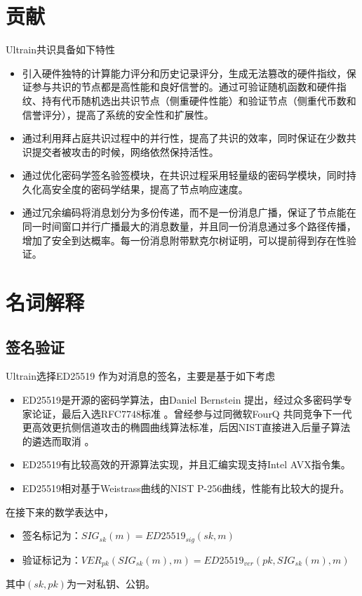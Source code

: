 \documentclass[12pt, UTF8]{article}
\begin{document}
\section{贡献}
Ultrain共识具备如下特性
\begin{itemize}
\item 引入硬件独特的计算能力评分和历史记录评分，生成无法篡改的硬件指纹，保证参与共识的节点都是高性能和良好信誉的。通过可验证随机函数和硬件指纹、持有代币随机选出共识节点（侧重硬件性能）和验证节点（侧重代币数和信誉评分），提高了系统的安全性和扩展性。
\item 通过利用拜占庭共识过程中的并行性，提高了共识的效率，同时保证在少数共识提交者被攻击的时候，网络依然保持活性。

\item 通过优化密码学签名验签模块，在共识过程采用轻量级的密码学模块\cite{bogdanov2011spongent, aumasson2010quark}，同时持久化高安全度的密码学结果，提高了节点响应速度。
\item 通过冗余编码\cite{wang2005erasure}将消息划分为多份传递，而不是一份消息广播，保证了节点能在同一时间窗口并行广播最大的消息数量，并且同一份消息通过多个路径传播，增加了安全到达概率。每一份消息附带默克尔树证明，可以提前得到存在性验证。
\end{itemize}

\section{名词解释}
\subsection{签名验证}
Ultrain选择ED25519\cite{bernstein2012high} 作为对消息的签名，主要是基于如下考虑
\begin{itemize}
\item ED25519是开源的密码学算法，由Daniel Bernstein 提出，经过众多密码学专家论证，最后入选RFC7748标准 。曾经参与过同微软FourQ\cite{longafour} 共同竞争下一代更高效更抗侧信道攻击的椭圆曲线算法标准，后因NIST直接进入后量子算法的遴选而取消 。
\item ED25519有比较高效的开源算法实现，并且汇编实现支持Intel AVX指令集。
\item ED25519相对基于Weistrass曲线的NIST P-256曲线，性能有比较大的提升。
\end{itemize}

在接下来的数学表达中，
\begin{itemize}
\item 签名标记为：$SIG_{sk}(m)=ED25519_{sig} (sk,m)$
\item 验证标记为：$VER_{pk}(SIG_{sk}(m), m)=ED25519_{ver} (pk,SIG_{sk}(m), m)$
\end{itemize}
其中$(sk, pk)$为一对私钥、公钥。
\end{document}
